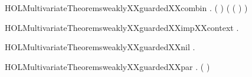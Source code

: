 \newcommand{\HOLMultivariateTheoremsweaklyXXguardedXXbackwardXXrules}{\UseVerbatim{HOLMultivariateTheoremsweaklyXXguardedXXbackwardXXrules}}
\begin{SaveVerbatim}{HOLMultivariateTheoremsweaklyXXguardedXXcombin}
\HOLTokenTurnstile{} \HOLSymConst{\HOLTokenForall{}}  .
         \HOLSymConst{\HOLTokenConj{}}    \HOLSymConst{\HOLTokenConj{}}    \HOLSymConst{\HOLTokenConj{}}
       (  \HOLSymConst{=}  ) \HOLSymConst{\HOLTokenImp{}}
         ( ( \HOLSymConst{\HOLTokenMapto{}} ) )
\end{SaveVerbatim}
\newcommand{\HOLMultivariateTheoremsweaklyXXguardedXXcombin}{\UseVerbatim{HOLMultivariateTheoremsweaklyXXguardedXXcombin}}
\begin{SaveVerbatim}{HOLMultivariateTheoremsweaklyXXguardedXXimpXXcontext}
\HOLTokenTurnstile{} \HOLSymConst{\HOLTokenForall{}} .    \HOLSymConst{\HOLTokenImp{}}   
\end{SaveVerbatim}
\newcommand{\HOLMultivariateTheoremsweaklyXXguardedXXimpXXcontext}{\UseVerbatim{HOLMultivariateTheoremsweaklyXXguardedXXimpXXcontext}}
\begin{SaveVerbatim}{HOLMultivariateTheoremsweaklyXXguardedXXnil}
\HOLTokenTurnstile{} \HOLSymConst{\HOLTokenForall{}}.   
\end{SaveVerbatim}
\newcommand{\HOLMultivariateTheoremsweaklyXXguardedXXnil}{\UseVerbatim{HOLMultivariateTheoremsweaklyXXguardedXXnil}}
\begin{SaveVerbatim}{HOLMultivariateTheoremsweaklyXXguardedXXpar}
\HOLTokenTurnstile{} \HOLSymConst{\HOLTokenForall{}}  .
         ( \HOLSymConst{\ensuremath{\parallel}} ) \HOLSymConst{\HOLTokenImp{}}
          \HOLSymConst{\HOLTokenConj{}}   
\end{SaveVerbatim}
